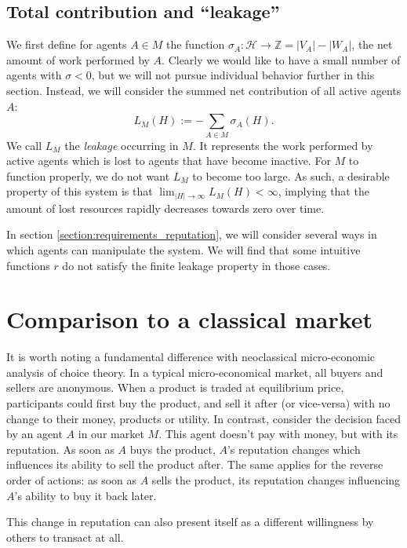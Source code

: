\subsection{Total contribution and ``leakage''}
We first define for agents $A \in M$ the function $\sigma_A: \mathcal{H} \to \mathds{Z} = |V_A| - |W_A|$, the net amount of work performed by $A$. 
Clearly we would like to have a small number of agents with $\sigma < 0$, 
but we will not pursue individual behavior further in this section. 
Instead, we will consider the summed net contribution of all active agents $A$:
\[L_M(H) := -\sum_{A \in M} \sigma_A(H).\]
We call $L_M$ the \emph{leakage} occurring in $M$. 
It represents the work performed by active agents which is lost to agents that have become inactive. 
For $M$ to function properly, 
we do not want $L_M$ to become too large. 
As such, a desirable property of this system is that $\lim_{|H| \to \infty} L_M(H) < \infty$, 
implying that the amount of lost resources rapidly decreases towards zero over time. 

In section \ref{section:requirements_reputation}, we will consider several ways in which agents can manipulate the system. 
We will find that some intuitive functions $r$ do not satisfy the finite leakage property in those cases.

\section{Comparison to a classical market}
It is worth noting a fundamental difference with neoclassical micro-economic analysis of choice theory. 
In a typical micro-economical market, 
all buyers and sellers are anonymous. 
When a product is traded at equilibrium price, 
participants could first buy the product, 
and sell it after (or vice-versa) with no change to their money, products or utility. 
In contrast, consider the decision faced by an agent $A$ in our market $M$. 
This agent doesn't pay with money, 
but with its reputation. 
As soon as $A$ buys the product, 
$A$'s reputation changes which influences its ability to sell the product after. 
The same applies for the reverse order of actions: 
as soon as $A$ sells the product, 
its reputation changes influencing $A$'s ability to buy it back later.

This change in reputation can also present itself as a different willingness by others to transact at all.
